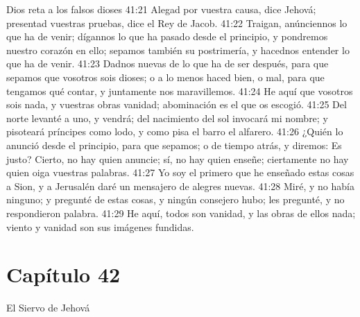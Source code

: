 Dios reta a los falsos dioses 
41:21 Alegad por vuestra causa, dice Jehová; presentad vuestras pruebas, dice el Rey de Jacob. 
41:22 Traigan, anúnciennos lo que ha de venir; dígannos lo que ha pasado desde el principio, y pondremos nuestro corazón en ello; sepamos también su postrimería, y hacednos entender lo que ha de venir. 
41:23 Dadnos nuevas de lo que ha de ser después, para que sepamos que vosotros sois dioses; o a lo menos haced bien, o mal, para que tengamos qué contar, y juntamente nos maravillemos. 
41:24 He aquí que vosotros sois nada, y vuestras obras vanidad; abominación es el que os escogió. 
41:25 Del norte levanté a uno, y vendrá; del nacimiento del sol invocará mi nombre; y pisoteará príncipes como lodo, y como pisa el barro el alfarero. 
41:26 ¿Quién lo anunció desde el principio, para que sepamos; o de tiempo atrás, y diremos: Es justo? Cierto, no hay quien anuncie; sí, no hay quien enseñe; ciertamente no hay quien oiga vuestras palabras. 
41:27 Yo soy el primero que he enseñado estas cosas a Sion, y a Jerusalén daré un mensajero de alegres nuevas. 
41:28 Miré, y no había ninguno; y pregunté de estas cosas, y ningún consejero hubo; les pregunté, y no respondieron palabra. 
41:29 He aquí, todos son vanidad, y las obras de ellos nada; viento y vanidad son sus imágenes fundidas. 
\section*{Capítulo 42 }
El Siervo de Jehová 
 
